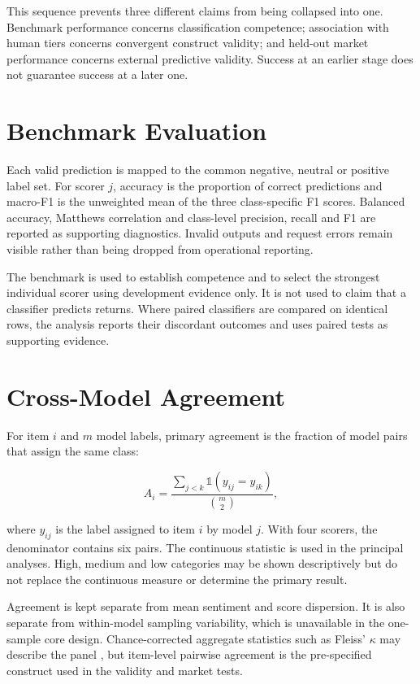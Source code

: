 \documentclass[11pt,a4paper,oneside]{book}
\let\parencite\citep
\begin{document}
This sequence prevents three different claims from being collapsed into one.
Benchmark performance concerns classification competence; association with human tiers concerns convergent construct validity; and held-out market performance concerns external predictive validity.
Success at an earlier stage does not guarantee success at a later one.

\section{Benchmark Evaluation}
\label{sec:method-benchmark}

Each valid prediction is mapped to the common negative, neutral or positive label set.
For scorer $j$, accuracy is the proportion of correct predictions and macro-F1 is the unweighted mean of the three class-specific F1 scores.
Balanced accuracy, Matthews correlation and class-level precision, recall and F1 are reported as supporting diagnostics.
Invalid outputs and request errors remain visible rather than being dropped from operational reporting.

The benchmark is used to establish competence and to select the strongest individual scorer using development evidence only.
It is not used to claim that a classifier predicts returns.
Where paired classifiers are compared on identical rows, the analysis reports their discordant outcomes and uses paired tests as supporting evidence.

\section{Cross-Model Agreement}
\label{sec:method-agreement}

For item $i$ and $m$ model labels, primary agreement is the fraction of model pairs that assign the same class:

\begin{equation}
  A_i =
  \frac{\displaystyle\sum_{j<k}\mathbb{1}(y_{ij}=y_{ik})}
       {\binom{m}{2}},
  \label{eq:agreement}
\end{equation}

where $y_{ij}$ is the label assigned to item $i$ by model $j$.
With four scorers, the denominator contains six pairs.
The continuous statistic is used in the principal analyses.
High, medium and low categories may be shown descriptively but do not replace the continuous measure or determine the primary result.

Agreement is kept separate from mean sentiment and score dispersion.
It is also separate from within-model sampling variability, which is unavailable in the one-sample core design.
Chance-corrected aggregate statistics such as Fleiss' $\kappa$ may describe the panel \parencite{fleiss1971kappa}, but item-level pairwise agreement is the pre-specified construct used in the validity and market tests.
\end{document}
